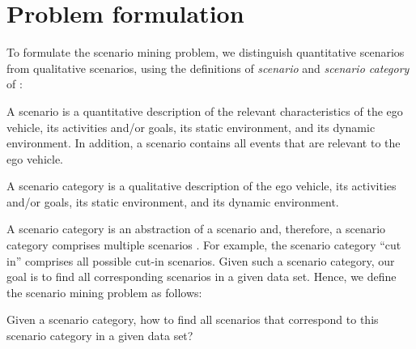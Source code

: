 \section{Problem formulation}
\label{sec:problem}

To formulate the scenario mining problem, we distinguish quantitative scenarios from qualitative scenarios, using the definitions of \emph{scenario} and \emph{scenario category} of \autocite{degelder2018ontology}:

\begin{definition}[Scenario]
	\label{def:scenario}
	A scenario is a quantitative description of the relevant characteristics of the ego vehicle, its activities and/or goals, its static environment, and its dynamic environment. In addition, a scenario contains all events that are relevant to the ego vehicle.
\end{definition}

\begin{definition}
	\label{def:scenario category}
	A scenario category is a qualitative description of the ego vehicle, its activities and/or goals, its static environment, and its dynamic environment.
\end{definition}

\cstarta
A scenario category is an abstraction of a scenario and, therefore, a scenario category comprises multiple scenarios \autocite{degelder2018ontology}.
For example, the scenario category ``cut in'' comprises all possible cut-in scenarios. 
Given such a scenario category, our goal is to find all corresponding scenarios in a given data set. 
Hence, we define the scenario mining problem as follows:
\begin{problem}
	Given a scenario category, how to find all scenarios that correspond to this scenario category in a given data set?
\end{problem}
\cenda

